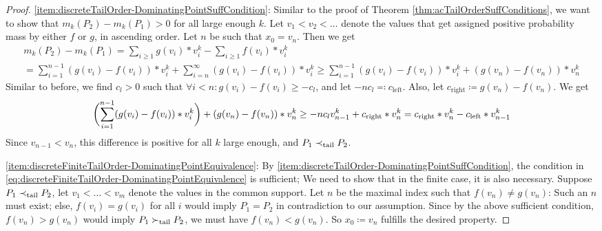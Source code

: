 \documentclass[a4paper]{scrreprt}
\begin{document}
    \begin{proof}
        \ref{item:discreteTailOrder-DominatingPointSuffCondition}:
        Similar to the proof of Theorem \ref{thm:acTailOrderSuffConditions}, we want to show that $m_k(P_2) - m_k(P_1) > 0$ for all large enough $k$.
        Let $v_1 < v_2 < \dots$ denote the values that get assigned positive probability mass by either $f$ or $g$, in ascending order.
        Let $n$ be such that $x_0 = v_n$. Then we get
        \begin{multline*}
            m_k(P_2) - m_k(P_1)
            = \sum_{i \geq 1} g(v_i)*v_i^k - \sum_{i \geq 1} f(v_i)*v_i^k \\
            = \sum_{i = 1}^{n-1} (g(v_i) - f(v_i))*v_i^k + \sum_{i = n}^{\infty} (g(v_i) - f(v_i))*v_i^k
            \geq \sum_{i = 1}^{n-1} (g(v_i) - f(v_i))*v_i^k + (g(v_n) - f(v_n)) * v_n^k
        \end{multline*}
        Similar to before, we find $c_{l} > 0$ such that $\forall i < n: g(v_i) - f(v_i) \geq - c_{l}$, and let $- n c_l \eqqcolon c_{\text{left}}$. Also, let $c_{\text{right}} \coloneqq g(v_n) - f(v_n)$. We get
        \begin{multline*}
            \biggl( \sum_{i = 1}^{n-1} (g(v_i) - f(v_i))*v_i^k\biggr) + (g(v_n) - f(v_n)) * v_n^k
            \geq -n c_l v_{n-1}^k + c_{\text{right}}*v_n^k = c_{\text{right}}*v_n^k  - c_{\text{left}}*v_{n-1}^k
        \end{multline*}
        Since $v_{n-1} < v_n$, this difference is positive for all $k$ large enough, and $P_1 \prec_{\text{tail}} P_2$.
        
        \ref{item:discreteFiniteTailOrder-DominatingPointEquivalence}:
        By \ref{item:discreteTailOrder-DominatingPointSuffCondition}, the condition in \eqref{eq:discreteFiniteTailOrder-DominatingPointEquivalence} is sufficient; We need to show that in the finite case, it is also necessary.
        Suppose $P_1 \prec_{\text{tail}} P_2$, let $v_1 < \dots < v_m$ denote the values in the common support.
        Let $n$ be the maximal index such that $f(v_n) \neq g(v_n)$: Such an $n$ must exist; else, $f(v_i) = g(v_i)$ for all $i$ would imply $P_1 = P_2$ in contradiction to our assumption.
        Since by the above sufficient condition, $f(v_n) > g(v_n)$ would imply $P_1 \succ_{\text{tail}} P_2$, we must have $f(v_n) < g(v_n)$. So $x_0 \coloneqq v_n$ fulfills the desired property.
    \end{proof}
\end{document}
